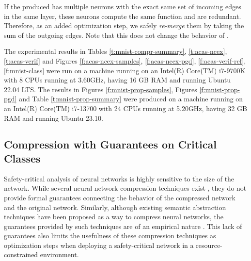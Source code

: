 If the \abs produced has multiple neurons with the exact same set of incoming
edges in the same layer, these neurons compute the same function and are
redundant. Therefore, as an added optimization step, we safely \textit{re-merge}
them by taking the sum of the outgoing edges. Note that this does not change the
behavior of \abs.

The experimental results in Tables
\ref{t:mnist-compr-summary}, 
\ref{t:acas-ncex}, \ref{t:acas-verif} and Figures \ref{f:acas-ncex-samples},
\ref{f:acas-ncex-pgd}, \ref{f:acas-verif-ref},
\ref{f:mnist-class} were
run on a machine running on an Intel(R) Core(TM) i7-9700K with 8 CPUs running at
3.60GHz, having 16 GB RAM and running Ubuntu 22.04 LTS. The results in
Figures \ref{f:mnist-prop-samples}, Figures \ref{f:mnist-prop-pgd} and Table
\ref{t:mnist-prop-summary} were produced on a 
machine running on an Intel(R) Core(TM) i7-13700 with 24 CPUs running at
5.20GHz, having 32 GB RAM and running Ubuntu 23.10.

\subsection{Compression with Guarantees on Critical Classes}
\label{s:exp-mnist-comp}



Safety-critical analysis of neural networks is highly sensitive to the size of
the network. While several neural network compression techniques exist 
\cite{dnn-compression}, they do not provide formal guarantees 
connecting the behavior of the compressed network and the original network.
Similarly, although existing semantic abstraction techniques have been proposed
as a way to compress neural networks, the guarantees provided by such 
techniques are of an empirical nature \cite{lin-comb-abs-jan}.
This lack of guarantees also limits the usefulness of these compression
techniques as optimization steps when deploying a safety-critical network in a
resource-constrained environment. 

